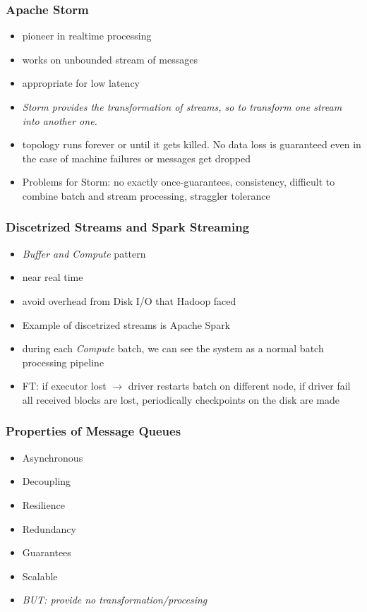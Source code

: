 \documentclass[a4paper]{article}
\begin{document}
\begin{multicols}{3}
\subsubsection{Apache Storm}
\begin{itemize}
    \item pioneer in realtime processing
    \item works on unbounded stream of messages 
    \item appropriate for low latency
    \item \textit{Storm provides the transformation of streams, so to transform one stream into another one.}
    \item topology runs forever or until it gets killed. No data loss is guaranteed even in the case of machine failures or messages get dropped
    \item Problems for Storm: no exactly once-guarantees, consistency, difficult to combine batch and stream processing, straggler tolerance
\end{itemize}

\subsubsection{Discetrized Streams and Spark Streaming}
\begin{itemize}
    \item \textit{Buffer and Compute} pattern
    \item near real time
    \item avoid overhead from Disk I/O that Hadoop faced 
    \item Example of discetrized streams is Apache Spark
    \item during each \textit{Compute} batch, we can see the system as a normal batch processing pipeline
    \item FT: if executor lost $\rightarrow$ driver restarts batch on different node, if driver fail all received blocks are lost, periodically checkpoints on the disk are made
\end{itemize}

\subsubsection{Properties of Message Queues}
\begin{itemize}
    \item Asynchronous
    \item Decoupling
    \item Resilience
    \item Redundancy
    \item Guarantees
    \item Scalable
    \item \textit{BUT: provide no transformation/procesing}
\end{itemize}


\end{multicols}
\end{document}
